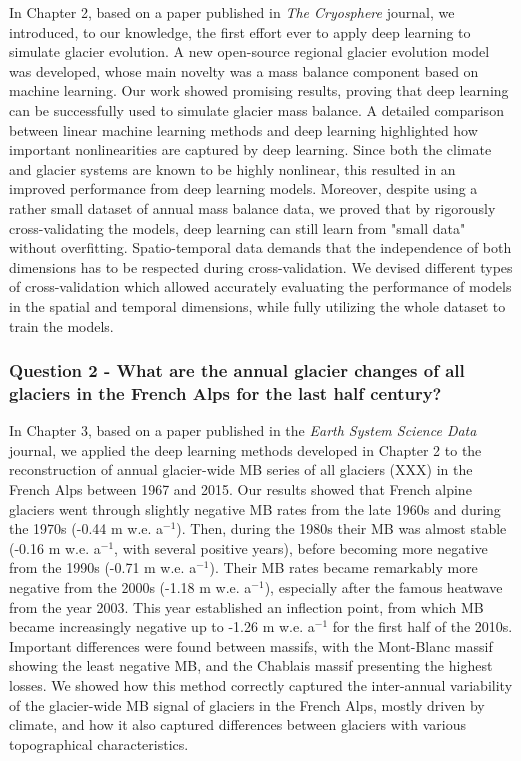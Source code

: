 In Chapter 2, based on a paper published in \textit{The Cryosphere} journal, we introduced, to our knowledge, the first effort ever to apply deep learning to simulate glacier evolution. A new open-source regional glacier evolution model was developed, whose main novelty was a mass balance component based on machine learning. Our work showed promising results, proving that deep learning can be successfully used to simulate glacier mass balance. A detailed comparison between linear machine learning methods and deep learning highlighted how important nonlinearities are captured by deep learning. Since both the climate and glacier systems are known to be highly nonlinear, this resulted in an improved performance from deep learning models. Moreover, despite using a rather small dataset of annual mass balance data, we proved that by rigorously cross-validating the models, deep learning can still learn from "small data" without overfitting. Spatio-temporal data demands that the independence of both dimensions has to be respected during cross-validation. We devised different types of cross-validation which allowed accurately evaluating the performance of models in the spatial and temporal dimensions, while fully utilizing the whole dataset to train the models. 

\subsubsection{Question 2 - What are the annual glacier changes of all glaciers in the French Alps for the last half century?}

In Chapter 3, based on a paper published in the \textit{Earth System Science Data} journal, we applied the deep learning methods developed in Chapter 2 to the reconstruction of annual glacier-wide MB series of all glaciers (XXX) in the French Alps between 1967 and 2015. Our results showed that French alpine glaciers went through slightly negative MB rates from the late 1960s and during the 1970s (-0.44 m w.e. a$^{-1}$). Then, during the 1980s their MB was almost stable (-0.16 m w.e. a$^{-1}$, with several positive years), before becoming more negative from the 1990s (-0.71 m w.e. a$^{-1}$). Their MB rates became remarkably more negative from the 2000s (-1.18 m w.e. a$^{-1}$), especially after the famous heatwave from the year 2003. This year established an inflection point, from which MB became increasingly negative up to -1.26 m w.e. a$^{-1}$ for the first half of the 2010s. Important differences were found between massifs, with the Mont-Blanc massif showing the least negative MB, and the Chablais massif presenting the highest losses. We showed how this method correctly captured the inter-annual variability of the glacier-wide MB signal of glaciers in the French Alps, mostly driven by climate, and how it also captured differences between glaciers with various topographical characteristics. 

